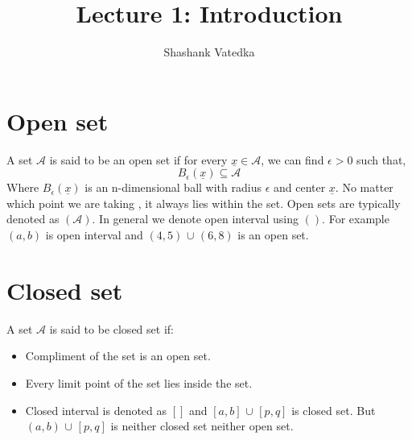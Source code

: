 \documentclass{article}
\title{Lecture 1: Introduction}
\author{Shashank Vatedka}
\begin{document}



\section{Open set}

A set $\mathcal{A}$ is said to be an open set if for every $\underline{x} \in \mathcal{A}$, we can find $\epsilon > 0$ such that,
\begin{equation}
B_{\epsilon}(\underline{x}) \subseteq \mathcal{A}
\end{equation}
Where $B_{\epsilon}(\underline{x})$	 is an n-dimensional ball with radius $\epsilon$ and center $\underline{x}$. No matter which point we are taking , it always lies within  the set. Open sets are typically denoted as $\left( \mathcal{A}\right)$. In general we denote  open interval using $\left( \right)$. For example $\left(a, b\right)$ is open interval and $\left(4,5\right)$ $\cup$ $\left( 6,8\right)$ is an open set.
\section{Closed set}
A set $\mathcal{A}$ is said to be closed set if:
\begin{itemize}
	\item  Compliment of the set is an open set. 
	\item Every limit point of the set lies inside the set.
	\item Closed interval is  denoted as $\left[\right]$ and $\left[ a, b\right]$ $\cup$ $\left[ p, q\right]$ is closed set. But $\left(a, b\right)$ $\cup$ $\left[p, q\right]$ is neither closed set neither open set.
\end{itemize}
\end{document}
